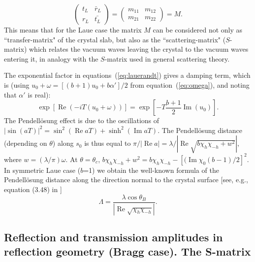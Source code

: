 \documentclass{iucr}
\begin{document}
\begin{equation}\label{eq:MtransferLaue}
    \begin{pmatrix}
    t_L & \bar{r}_L\\
    r_L & \bar{t_L}
    \end{pmatrix}
    =
    \begin{pmatrix}
    m_{11} & m_{12}\\
    m_{21} & m_{22}
    \end{pmatrix}
    = M.
\end{equation}
This means that for the Laue case the matrix $M$ can be considered not only as ``transfer-matrix" of the crystal slab, but also as the ``scattering-matrix" ($S$-matrix) which relates the vacuum waves leaving the crystal to the vacuum waves entering it, in analogy with the $S$-matrix used in general scattering theory.  

The exponential factor in equations~(\ref{eq:lauerandt}) gives a damping term, which is (using $u_0 +\omega=[(b+1)u_0+b\alpha']/2$ from equation~({\ref{eq:omega}}), 
and noting that $\alpha'$ is real):  
\begin{equation}
   \exp[\operatorname{Re}(-iT(u_0+\omega))] = 
    \exp[-T \frac{b+1}{2}\operatorname{Im}(u_0)].
\end{equation}
The Pendell\"osung effect is due to the oscillations of $|\sin(aT)|^2=\sin^2(\operatorname{Re} aT) + \sinh^2(\operatorname{Im}aT)$.
The Pendell\"osung distance (depending on $\theta$) along $s_0$ is thus equal to  
$\pi / |\operatorname{Re} a|=\lambda / |\operatorname{Re}\sqrt{b\chi_h\chi_{-h} + w^2}|$, where $w=(\lambda / \pi) \omega $.
At $\theta=\theta_c$, $b \chi_h \chi_{-h}+w^2=b \chi_h \chi_{-h} - [(\operatorname{Im}\chi_0(b-1)/2]^2$. In symmetric Laue case ($b$=1) we obtain the well-known formula of the Pendell\"osung distance along the direction normal to the crystal surface [see, e.g., equation (3.48) in \cite{pinskerbook}]
\begin{equation}\label{eq:Pendellosung}
    \Lambda =\frac{\lambda \cos\theta_B}{|\operatorname{Re}\sqrt{\chi_h\chi_{-h}}|} .
\end{equation}

\subsection{Reflection and transmission amplitudes in reflection geometry (Bragg case). The S-matrix}
\label{sec:TTsolutionsBragg}
\end{document}
